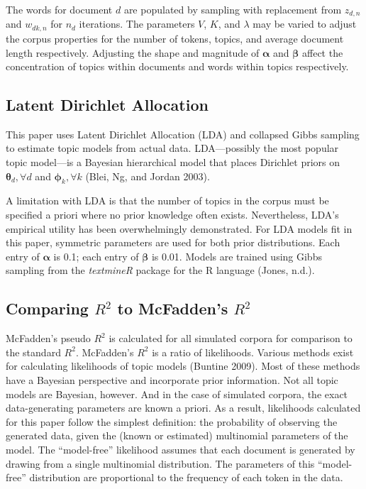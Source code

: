\documentclass[conference,final,]{IEEEtran}
\begin{document}
The words for document \(d\) are populated by sampling with replacement
from \(z_{d,n}\) and \(w_{dk,n}\) for \(n_d\) iterations. The parameters
\(V\), \(K\), and \(\lambda\) may be varied to adjust the corpus
properties for the number of tokens, topics, and average document length
respectively. Adjusting the shape and magnitude of \(\boldsymbol\alpha\)
and \(\boldsymbol\beta\) affect the concentration of topics within
documents and words within topics respectively.

\hypertarget{latent-dirichlet-allocation}{%
\subsection{Latent Dirichlet
Allocation}\label{latent-dirichlet-allocation}}

This paper uses Latent Dirichlet Allocation (LDA) and collapsed Gibbs
sampling to estimate topic models from actual data. LDA---possibly the
most popular topic model---is a Bayesian hierarchical model that places
Dirichlet priors on \(\boldsymbol\theta_d, \forall d\) and
\(\boldsymbol\phi_k, \forall k\) (Blei, Ng, and Jordan 2003).

A limitation with LDA is that the number of topics in the corpus must be
specified a priori where no prior knowledge often exists. Nevertheless,
LDA's empirical utility has been overwhelmingly demonstrated. For LDA
models fit in this paper, symmetric parameters are used for both prior
distributions. Each entry of \(\boldsymbol\alpha\) is 0.1; each entry of
\(\boldsymbol\beta\) is 0.01. Models are trained using Gibbs sampling
from the \emph{textmineR} package for the R language (Jones, n.d.).

\hypertarget{comparing-r2-to-mcfaddens-r2}{%
\subsection{\texorpdfstring{Comparing \(R^2\) to McFadden's
\(R^2\)}{Comparing R\^{}2 to McFadden's R\^{}2}}\label{comparing-r2-to-mcfaddens-r2}}

McFadden's pseudo \(R^2\) is calculated for all simulated corpora for
comparison to the standard \(R^2\). McFadden's \(R^2\) is a ratio of
likelihoods. Various methods exist for calculating likelihoods of topic
models (Buntine 2009). Most of these methods have a Bayesian perspective
and incorporate prior information. Not all topic models are Bayesian,
however. And in the case of simulated corpora, the exact data-generating
parameters are known a priori. As a result, likelihoods calculated for
this paper follow the simplest definition: the probability of observing
the generated data, given the (known or estimated) multinomial
parameters of the model. The ``model-free'' likelihood assumes that each
document is generated by drawing from a single multinomial distribution.
The parameters of this ``model-free'' distribution are proportional to
the frequency of each token in the data.
\end{document}

